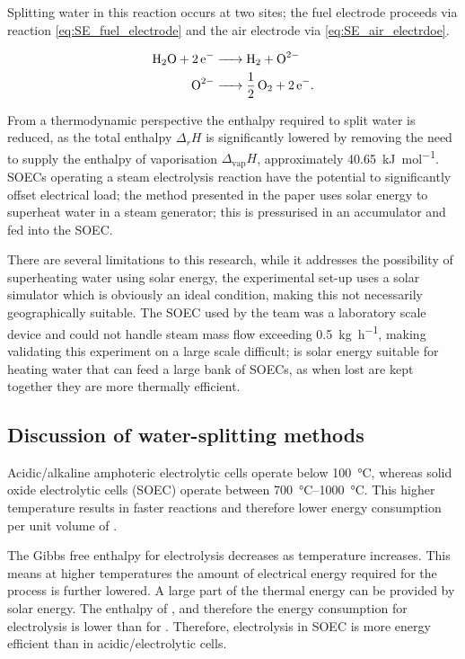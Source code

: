 Splitting water in this reaction occurs at two sites; the fuel electrode proceeds via reaction \eqref{eq:SE_fuel_electrode} and the air electrode via \eqref{eq:SE_air_electrdoe}.\cite{Schiller2019}

\begin{align}
	\ce{H2O + 2e- &-> H2 +O^2-}\label{eq:SE_fuel_electrode}\\
	\ce{O^2- &-> 1/2O2 + 2e-}\label{eq:SE_air_electrode}
.\end{align}

From a thermodynamic perspective the enthalpy required to split water is reduced, as the total enthalpy $\Delta_{r}H$ is significantly lowered by removing the need to supply the enthalpy of vaporisation $\Delta_{\text{vap}}H$, approximately \SI{40.65}{\kilo\joule\per\mole}\cite{Lemmon2017}.
SOECs operating a steam electrolysis reaction have the potential to significantly offset electrical load; the method presented in the paper uses solar energy to superheat water in a steam generator; this is pressurised in an accumulator and fed into the SOEC. 

There are several limitations to this research, while it addresses the possibility of superheating water using solar energy, the experimental set-up uses a solar simulator which is obviously an ideal condition, making this not necessarily geographically suitable.
The SOEC used by the team was a laboratory scale device and could not handle steam mass flow exceeding \SI{0.5}{\kilo\gram\per\hour}, making validating this experiment on a large scale difficult; is solar energy suitable for heating water that can feed a large bank of SOECs, as when lost are kept together they are more thermally efficient.


\subsection{Discussion of water-splitting methods}%
\label{sub:discussion_of_water_splitting_methods}

Acidic/alkaline amphoteric  electrolytic cells operate below \SI{100}{\celsius}\cite{Lei2019}, whereas solid oxide electrolytic cells (SOEC) operate between \SIrange{700}{1000}{\celsius}\cite{Schiller2019}.
This higher temperature results in faster reactions and therefore lower energy consumption per unit volume of .

The Gibbs free enthalpy for  electrolysis decreases as temperature increases.
This means at higher temperatures the amount of electrical energy required for the process is further lowered.
A large part of the thermal energy can be provided by solar energy.
The enthalpy of , and therefore the energy consumption for  electrolysis is lower than for .
Therefore,  electrolysis in SOEC is more energy efficient than in acidic/electrolytic cells.

